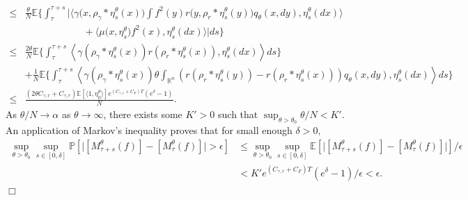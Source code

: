 \documentclass[12pt]{article}
\newenvironment {proof}{{\noindent\bf Proof }}{\hfill $\Box$ \medskip}
\begin{document}
\begin{proof}
\begin{equation}
\begin{aligned}
\leq &\frac{\theta}{N} \mathbb{E} \Bigg\{ \int_{\tau}^{\tau+s}\bigg|
\langle \gamma\big(x,\rho_{\gamma}*\eta^{\theta}_{s}(x)\big)
\int f^2(y)r\big(y,\rho_{r}*\eta^{\theta}_{s}(y)\big)q_\theta(x,dy) 
,\eta^{\theta}_{s}(dx)\rangle\\
& \qquad \qquad \qquad +\langle \mu\big(x,\eta^{\theta}_{s}\big)f^2(x) 
,\eta^{\theta}_{s}(dx)\rangle \bigg|ds \Bigg\}\\
\leq & \frac{2\theta}{N}\mathbb{E} \Bigg\{\int_{\tau}^{\tau+s} \left\langle \gamma(\rho_{\gamma}*\eta^{\theta}_{s}(x))r(\rho_{r}*\eta^{\theta}_{s}(x)), \eta^{\theta}_{s}(dx) \right\rangle ds\Bigg\} \\
& + \frac{1}{N}\mathbb{E} \Bigg\{\int_{\tau}^{\tau+s} \left\langle \gamma (\rho_{\gamma}*\eta^{\theta}_{s}(x))\theta\int_{\mathbb{R}^n}\left(r(\rho_{r}*\eta^{\theta}_{s}(y))-r(\rho_{r}*\eta^{\theta}_{s}(x))\right) q_\theta(x,dy), \eta^{\theta}_{s}(dx) \right\rangle ds\Bigg\}\\
\leq & \frac{(2 \theta C_{\gamma,r}+C_{\gamma,r})\mathbb{E}[\langle 1 ,\eta^{\theta}_{0}\rangle]e^{(C_{\gamma,r}+C_F)T}(e^\delta-1)}{N}.
\end{aligned}
\end{equation}
As $\theta / N \to \alpha$ as $\theta \to \infty$,
there exists some $K'>0$ such that 
$\sup_{\theta > \theta_0} \theta / N < K'$.
An application of Markov's inequality proves that
for small enough $\delta > 0,$
\begin{equation}
\begin{aligned}
\sup_{\theta > \theta_0}
\sup_{s \in [0, \delta]}
\mathbb{P}\left[\big| [M^{\theta}_{\tau+s}(f)] 
                        - [M^{\theta}_{\tau}(f)] \big|
                        > \epsilon\right]
&\leq  \sup_{\theta > \theta_0}
\sup_{s \in [0, \delta]}
\mathbb{E}\left[\big| [M^{\theta}_{\tau+s}(f)] 
                        - [M^{\theta}_{\tau}(f)] \big|
                        \right]/\epsilon \\
&< K'e^{(C_{\gamma,r}+C_F)T}(e^\delta-1)/\epsilon < \epsilon.
\end{aligned}    
\end{equation}
\end{proof}
\end{document}
